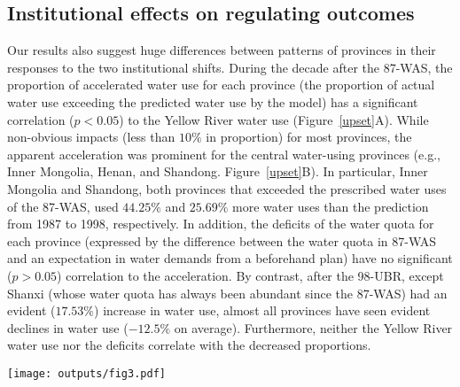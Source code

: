 \subsection{Institutional effects on regulating outcomes}
\label{result-3}
Our results also suggest huge differences between patterns of provinces in their responses to the two institutional shifts.
During the decade after the 87-WAS, the proportion of accelerated water use for each province (the proportion of actual water use exceeding the predicted water use by the model) has a significant correlation ($p<0.05$) to the Yellow River water use (Figure~\ref{upset}A).
While non-obvious impacts (less than $10\%$ in proportion) for most provinces, the apparent acceleration was prominent for the central water-using provinces (e.g., Inner Mongolia, Henan, and Shandong. Figure~\ref{upset}B).
In particular, Inner Mongolia and Shandong, both provinces that exceeded the prescribed water uses of the 87-WAS, used $44.25\%$ and $25.69\%$ more water uses than the prediction from 1987 to 1998, respectively.
In addition, the deficits of the water quota for each province (expressed by the difference between the water quota in 87-WAS and an expectation in water demands from a beforehand plan) have no significant ($p>0.05$) correlation to the acceleration.
By contrast, after the 98-UBR, except Shanxi (whose water quota has always been abundant since the 87-WAS) had an evident ($17.53\%$) increase in water use, almost all provinces have seen evident declines in water use ($-12.5\%$ on average).
Furthermore, neither the Yellow River water use nor the deficits correlate with the decreased proportions.

\begin{figure*}[!h]
    \centering
    \texttt{[image: outputs/fig3.pdf]}
    \caption{Responses of the provinces to the institutional shifts (upper: the 87-WAS, lower: the 98-UBR).
        \textbf{A.} The partial correlation coefficient between water use (WU) of Yellow River (YR), unsatisfied ratio (compared with requirements in water plan and supply in the 87-WAS), and the average accelerated ratio.
        \textbf{B.} Average accelerated ratio of water uses for each province in the YRB during the decade after 87-WAS (from 1987 to 1998).
        \textbf{Mian users:} Major water consumption provinces (over the median).
        \textbf{Overused:} violate the 87-WAS in average water uses.
    }
    \label{upset}
\end{figure*}
